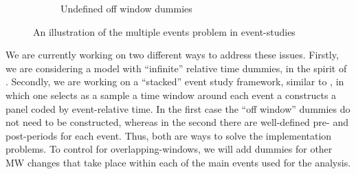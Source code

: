\begin{figure}[t!]
\begin{subfigure}{1\textwidth}
            \caption{Undefined off window dummies}
        \end{subfigure}
        \caption{An illustration of the multiple events problem in event-studies}
        \label{fig:multiple-events-example}
    \end{figure}
    
    We are currently working on two different ways to address these issues. Firstly, we are considering a model with ``infinite'' relative time dummies, in the spirit of \textcite[][, equation 1]{borusyak2017revisiting}. Secondly, we are working on a ``stacked'' event study framework, similar to \textcite{cengiz2019effect}, in which one selects as a sample a time window around each event a constructs a panel coded by event-relative time. In the first case the ``off window'' dummies do not need to be constructed, whereas in the second there are well-defined pre- and post-periods for each event. Thus, both are ways to solve the implementation problems. To control for overlapping-windows, we will add dummies for other MW changes that take place within each of the main events used for the analysis.
    
